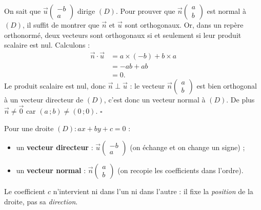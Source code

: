 \documentclass[11pt]{article}
\begin{document}
\begin{experience}
On sait que $\vec{u}\begin{pmatrix} -b \\ a \end{pmatrix}$ dirige $(D)$. Pour prouver que $\vec{n}\begin{pmatrix} a \\ b \end{pmatrix}$ est normal à $(D)$, il suffit de montrer que $\vec{n}$ et $\vec{u}$ sont orthogonaux. Or, dans un repère orthonormé, deux vecteurs sont orthogonaux si et seulement si leur produit scalaire est nul. Calculons :
\begin{align*}
\vec{n}\cdot\vec{u} &= a\times(-b) + b\times a \\
&= -ab + ab \\
&= 0.
\end{align*}
Le produit scalaire est nul, donc $\vec{n}\perp\vec{u}$ : le vecteur $\vec{n}\begin{pmatrix} a \\ b \end{pmatrix}$ est bien orthogonal à un vecteur directeur de $(D)$, c'est donc un vecteur normal à $(D)$. De plus $\vec{n}\neq\vec{0}$ car $(a\,;b)\neq(0\,;0)$. \hfill$\square$
\end{experience}

\begin{aretenir}
Pour une droite $(D) : ax+by+c=0$ :
\begin{itemize}
\item un \textbf{vecteur directeur} : $\vec{u}\begin{pmatrix} -b \\ a \end{pmatrix}$ (on échange et on change un signe) ;
\item un \textbf{vecteur normal} : $\vec{n}\begin{pmatrix} a \\ b \end{pmatrix}$ (on recopie les coefficients dans l'ordre).
\end{itemize}
Le coefficient $c$ n'intervient ni dans l'un ni dans l'autre : il fixe la \emph{position} de la droite, pas sa \emph{direction}.
\end{aretenir}
\end{document}
